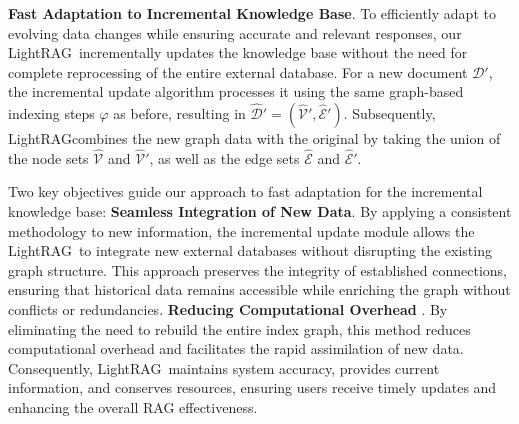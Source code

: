 \documentclass{article} %
\def\model{LightRAG}
\begin{document}

\textbf{Fast Adaptation to Incremental Knowledge Base}. To efficiently adapt to evolving data changes while ensuring accurate and relevant responses, our \model\ incrementally updates the knowledge base without the need for complete reprocessing of the entire external database. For a new document $\mathcal{D}'$, the incremental update algorithm processes it using the same graph-based indexing steps $\varphi$ as before, resulting in $\hat{\mathcal{D}}' = (\hat{\mathcal{V}}', \hat{\mathcal{E}}')$. Subsequently, \model combines the new graph data with the original by taking the union of the node sets $\hat{\mathcal{V}}$ and $\hat{\mathcal{V}}'$, as well as the edge sets $\hat{\mathcal{E}}$ and $\hat{\mathcal{E}}'$.

Two key objectives guide our approach to fast adaptation for the incremental knowledge base: \textbf{Seamless Integration of New Data}. By applying a consistent methodology to new information, the incremental update module allows the \model\ to integrate new external databases without disrupting the existing graph structure. This approach preserves the integrity of established connections, ensuring that historical data remains accessible while enriching the graph without conflicts or redundancies. \textbf{Reducing Computational Overhead
}. By eliminating the need to rebuild the entire index graph, this method reduces computational overhead and facilitates the rapid assimilation of new data. Consequently, \model\ maintains system accuracy, provides current information, and conserves resources, ensuring users receive timely updates and enhancing the overall RAG effectiveness.
\end{document}
